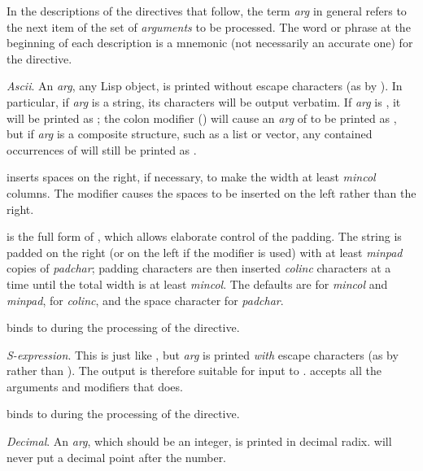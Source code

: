 In the descriptions of the directives that follow,
the term \emph{arg} in general
refers to the next item of the set of \emph{arguments} to be processed.
The word or phrase at the beginning of each description is a mnemonic
(not necessarily an accurate one) for the directive.
\begin{flushdesc}
\item[\cd{{\Xtilde}A}]
\emph{Ascii}.  An \emph{arg}, any Lisp object, is printed without escape characters
(as by ).  In particular, if \emph{arg} is a string, its characters
will be output verbatim.
If \emph{arg} is {\nil}, it will
be printed as {\false}; the colon modifier
() will cause an \emph{arg} of {\nil} to be printed as {\emptylist},
but if \emph{arg} is a composite structure, such as a list or vector,
any contained occurrences of {\nil} will still be printed as {\false}.

 inserts spaces on the right, if necessary, to make the
width at least \emph{mincol} columns.  The \cd{{\Xatsign}} modifier causes the spaces
to be inserted on the left rather than the right.

 is the full form of ,
which allows elaborate control of the padding.
The string is padded on the right (or on the left if the
\cd{{\Xatsign}} modifier is used) with at least \emph{minpad} copies
of \emph{padchar}; padding characters are then inserted \emph{colinc} characters
at a time until the total width is at least \emph{mincol}.
The defaults are  for \emph{mincol} and \emph{minpad},  for \emph{colinc},
and the space character for \emph{padchar}.

 binds 
to  during the processing of the  directive.

\item[\cd{{\Xtilde}S}]
\emph{S-expression}.
This is just like , but \emph{arg} is printed \emph{with} escape
characters (as by  rather than ).  The output is
therefore suitable for input to .   accepts
all the arguments and modifiers that  does.

 binds 
to  during the processing of the  directive.

\newpage%

\item[\cd{{\Xtilde}D}]
\emph{Decimal}.
An \emph{arg}, which should be an integer, is printed in decimal radix.
 will never put a decimal point after the number.


\end{flushdesc}
